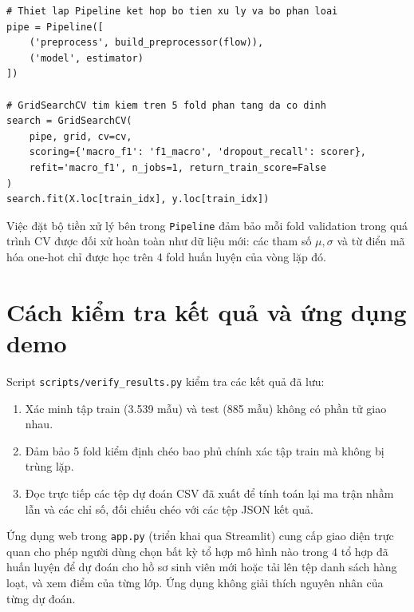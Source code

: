 {\footnotesize\begin{verbatim}
# Thiet lap Pipeline ket hop bo tien xu ly va bo phan loai
pipe = Pipeline([
    ('preprocess', build_preprocessor(flow)),
    ('model', estimator)
])

# GridSearchCV tim kiem tren 5 fold phan tang da co dinh
search = GridSearchCV(
    pipe, grid, cv=cv,
    scoring={'macro_f1': 'f1_macro', 'dropout_recall': scorer},
    refit='macro_f1', n_jobs=1, return_train_score=False
)
search.fit(X.loc[train_idx], y.loc[train_idx])
\end{verbatim}
}

Việc đặt bộ tiền xử lý bên trong \texttt{Pipeline} đảm bảo mỗi fold validation trong quá trình CV được đối xử hoàn toàn như dữ liệu mới: các tham số $\mu, \sigma$ và từ điển mã hóa one-hot chỉ được học trên 4 fold huấn luyện của vòng lặp đó.

\section{Cách kiểm tra kết quả và ứng dụng demo}
Script \texttt{scripts/verify\_results.py} kiểm tra các kết quả đã lưu:
\begin{enumerate}
    \item Xác minh tập train (3.539 mẫu) và test (885 mẫu) không có phần tử giao nhau.
    \item Đảm bảo 5 fold kiểm định chéo bao phủ chính xác tập train mà không bị trùng lặp.
    \item Đọc trực tiếp các tệp dự đoán CSV đã xuất để tính toán lại ma trận nhầm lẫn và các chỉ số, đối chiếu chéo với các tệp JSON kết quả.
\end{enumerate}

Ứng dụng web trong \texttt{app.py} (triển khai qua Streamlit) cung cấp giao diện trực quan cho phép người dùng chọn bất kỳ tổ hợp mô hình nào trong 4 tổ hợp đã huấn luyện để dự đoán cho hồ sơ sinh viên mới hoặc tải lên tệp danh sách hàng loạt, và xem điểm của từng lớp. Ứng dụng không giải thích nguyên nhân của từng dự đoán.
